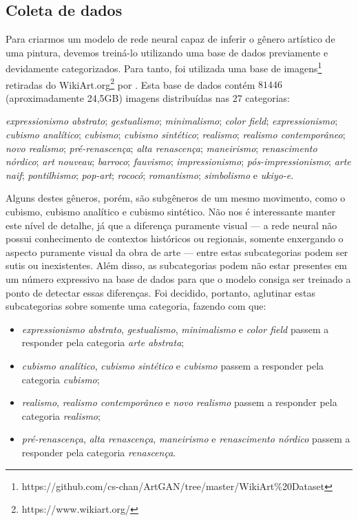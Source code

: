 \documentclass[12pt, a4paper]{article}
\begin{document}
\subsection{Coleta de dados}
Para criarmos um modelo de rede neural capaz de inferir o gênero artístico de uma pintura, devemos treiná-lo utilizando uma base de dados previamente e devidamente categorizados. Para tanto, foi utilizada uma base de imagens\footnote{https://github.com/cs-chan/ArtGAN/tree/master/WikiArt\%20Dataset} retiradas do WikiArt.org\footnote{https://www.wikiart.org/} por \cite{icip2016}. Esta base de dados contém $81446$ (aproximadamente 24,5GB) imagens distribuídas nas 27 categorias: 

\emph{expressionismo abstrato}; 
\emph{gestualismo}; 
\emph{minimalismo}; 
\emph{color field}; 
\emph{expressionismo}; 
\emph{cubismo analítico}; 
\emph{cubismo}; 
\emph{cubismo sintético}; 
\emph{realismo}; 
\emph{realismo contemporâneo}; 
\emph{novo realismo}; 
\emph{pré-renascença}; 
\emph{alta renascença}; 
\emph{maneirismo}; 
\emph{renascimento nórdico}; 
\emph{art nouveau}; 
\emph{barroco}; 
\emph{fauvismo}; 
\emph{impressionismo}; 
\emph{pós-impressionismo}; 
\emph{arte naif}; 
\emph{pontilhismo}; 
\emph{pop-art}; 
\emph{rococó}; 
\emph{romantismo}; 
\emph{simbolismo} e
\emph{ukiyo-e}.

Alguns destes gêneros, porém, são subgêneros de um mesmo movimento, como o cubismo, cubismo analítico e cubismo sintético. Não nos é interessante manter este nível de detalhe, já que a diferença puramente visual --- a rede neural não possui conhecimento de contextos históricos ou regionais, somente enxergando o aspecto puramente visual da obra de arte --- entre estas subcategorias podem ser sutis ou inexistentes. Além disso, as subcategorias podem não estar presentes em um número expressivo na base de dados para que o modelo consiga ser treinado a ponto de detectar essas diferenças. Foi decidido, portanto, aglutinar estas subcategorias sobre somente uma categoria, fazendo com que:

\begin{itemize}
\item \emph{expressionismo abstrato}, \emph{gestualismo}, \emph{minimalismo} e \emph{color field} passem a responder pela categoria \emph{arte abstrata};
\item \emph{cubismo analítico}, \emph{cubismo sintético} e \emph{cubismo} passem a responder pela categoria \emph{cubismo};
\item \emph{realismo}, \emph{realismo contemporâneo} e \emph{novo realismo} passem a responder pela categoria \emph{realismo};
\item \emph{pré-renascença}, \emph{alta renascença}, \emph{maneirismo} e \emph{renascimento nórdico} passem a responder pela categoria \emph{renascença}.
\end{itemize}
\end{document}
